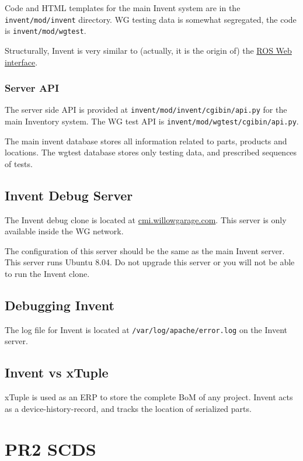 \documentclass[11pt]{book}
\begin{document}
Code and HTML templates for the main Invent system are in the \texttt{invent/mod/invent} directory. WG testing data is somewhat segregated, the code is \texttt{invent/mod/wgtest}.

Structurally, Invent is very similar to (actually, it is the origin of) the \href{http://www.ros.org/wiki/web\_interface}{ROS Web interface}. 

\subsection{Server API}

The server side API is provided at \texttt{invent/mod/invent/cgibin/api.py} for the main Inventory system. The WG test API is  \texttt{invent/mod/wgtest/cgibin/api.py}.

The main invent database stores all information related to parts, products and locations. The wgtest database stores only testing data, and prescribed sequences of tests. 



\section {Invent Debug Server}

The Invent debug clone is located at \href{http://cmi.willowgarage.com}{cmi.willowgarage.com}. This server is only available inside the WG network.

The configuration of this server should be the same as the main Invent server. This server runs Ubuntu 8.04. Do not upgrade this server or you will not be able to run the Invent clone.

\section{Debugging Invent}

The log file for Invent is located at \texttt{/var/log/apache/error.log} on the Invent server. 

\section{Invent vs xTuple}

xTuple is used as an ERP to store the complete BoM of any project. Invent acts as a device-history-record, and tracks the location of serialized parts.

\chapter {PR2 SCDS}
\end{document}

